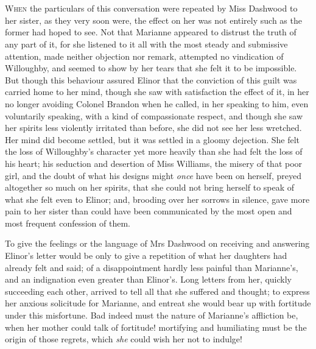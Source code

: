 \chapter[Chapter \thechapter]{}
\lettrine[lines=4,lraise=0.3]{W}{hen} the particulars of this conversation were repeated by Miss Dashwood to her sister, as they very soon were, the effect on her was not entirely such as the former had hoped to see. Not that Marianne appeared to distrust the truth of any part of it, for she listened to it all with the most steady and submissive attention, made neither objection nor remark, attempted no vindication of Willoughby, and seemed to show by her tears that she felt it to be impossible. But though this behaviour assured Elinor that the conviction of this guilt was carried home to her mind, though she saw with satisfaction the effect of it, in her no longer avoiding Colonel Brandon when he called, in her speaking to him, even voluntarily speaking, with a kind of compassionate respect, and though she saw her spirits less violently irritated than before, she did not see her less wretched. Her mind did become settled, but it was settled in a gloomy dejection. She felt the loss of Willoughby’s character yet more heavily than she had felt the loss of his heart; his seduction and desertion of Miss Williams, the misery of that poor girl, and the doubt of what his designs might \textit{once} have been on herself, preyed altogether so much on her spirits, that she could not bring herself to speak of what she felt even to Elinor; and, brooding over her sorrows in silence, gave more pain to her sister than could have been communicated by the most open and most frequent confession of them.

To give the feelings or the language of Mrs Dashwood on receiving and answering Elinor’s letter would be only to give a repetition of what her daughters had already felt and said; of a disappointment hardly less painful than Marianne’s, and an indignation even greater than Elinor’s. Long letters from her, quickly succeeding each other, arrived to tell all that she suffered and thought; to express her anxious solicitude for Marianne, and entreat she would bear up with fortitude under this misfortune. Bad indeed must the nature of Marianne’s affliction be, when her mother could talk of fortitude! mortifying and humiliating must be the origin of those regrets, which \textit{she} could wish her not to indulge!

